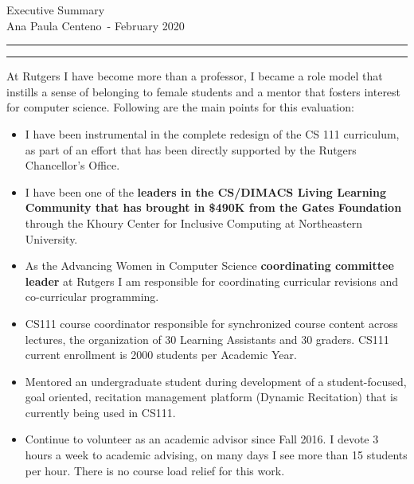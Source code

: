 \documentclass[11pt]{article}
\newcommand{\soptitle}{Executive Summary}
\newcommand{\yourname}{Ana Paula Centeno}
\begin{document}
\begin{center}\LARGE\soptitle\\
\large \yourname\ - February 2020
\end{center}

\hrule
\vspace{1pt}
\hrule height 1pt

\bigskip
\bigskip

At Rutgers I have become more than a professor, I became a role model
that instills a sense of belonging to female students and a mentor
that fosters interest for computer science.  Following are the main
points for this evaluation:

\bigskip

\begin{itemize}

  \item I have been instrumental in the complete redesign of the CS
    111 curriculum, as part of an effort that has been directly
    supported by the Rutgers Chancellor's Office.

  \item I have been one of the {\bf leaders in the CS/DIMACS Living
    Learning Community that has brought in \$490K from the Gates
    Foundation} through the Khoury Center for Inclusive Computing at
    Northeastern University. 
    
  \item As the Advancing Women in Computer Science {\bf coordinating
    committee leader} at Rutgers I am responsible for coordinating
    curricular revisions and co-curricular programming. 


  \item CS111 course coordinator responsible for synchronized course
    content across lectures, the organization of 30 Learning
    Assistants and 30 graders. CS111 current enrollment is 2000
    students per Academic Year.

  \item Mentored an undergraduate student during development of a
    student-focused, goal oriented, recitation management platform
    (Dynamic Recitation) that is currently being used in CS111.
    
  \item Continue to volunteer as an academic advisor since Fall
    2016. I devote 3 hours a week to academic advising, on many days I
    see more than 15 students per hour. There is no course load relief
    for this work.


\end{itemize}
\end{document}
